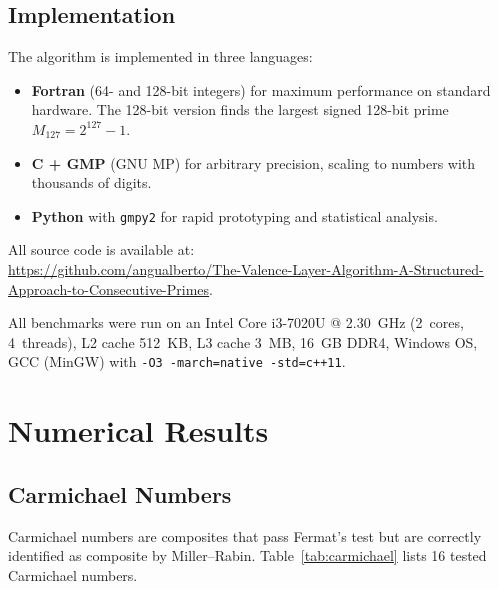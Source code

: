\documentclass[12pt,a4paper]{article}
\theoremstyle{plain}
\begin{document}
\subsection{Implementation}
\label{sec:impl}

The algorithm is implemented in three languages:
\begin{itemize}
  \item {\bf Fortran} (64- and 128-bit integers) for maximum
    performance on standard hardware. The 128-bit version finds
    the largest signed 128-bit prime $M_{127}=2^{127}-1$.
  \item {\bf C + GMP} (GNU MP) for arbitrary precision, scaling
    to numbers with thousands of digits.
  \item {\bf Python} with {\tt gmpy2} for rapid prototyping and
    statistical analysis.
\end{itemize}

All source code is available at:\\
\url{https://github.com/angualberto/The-Valence-Layer-Algorithm-A-Structured-Approach-to-Consecutive-Primes}.

All benchmarks were run on an Intel Core i3-7020U @ 2.30~GHz
(2~cores, 4~threads), L2 cache 512~KB, L3 cache 3~MB, 16~GB
DDR4, Windows OS, GCC (MinGW) with \texttt{-O3 -march=native -std=c++11}.

\section{Numerical Results}
\label{sec:num}

\subsection{Carmichael Numbers}

Carmichael numbers are composites that pass Fermat's test but are
correctly identified as composite by Miller--Rabin.
Table~\ref{tab:carmichael} lists 16 tested Carmichael numbers.
\end{document}
